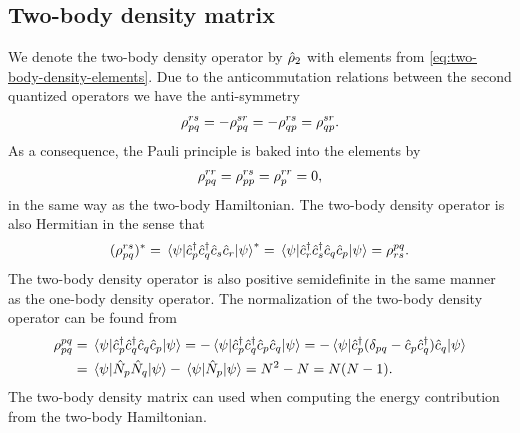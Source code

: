         \subsection{Two-body density matrix}
            We denote the two-body density operator by $\hat{\rho}_2$ with
            elements from \autoref{eq:two-body-density-elements}.
            Due to the anticommutation relations between the second quantized
            operators we have the anti-symmetry
            \begin{align}
                \rho^{rs}_{pq}
                = -\rho^{sr}_{pq}
                = -\rho^{rs}_{qp}
                = \rho^{sr}_{qp}.
            \end{align}
            As a consequence, the Pauli principle is baked into the elements by
            \begin{align}
                \rho^{rr}_{pq}
                = \rho^{rs}_{pp}
                = \rho^{rr}_{p}
                = 0,
            \end{align}
            in the same way as the two-body Hamiltonian.
            The two-body density operator is also Hermitian in the sense that
            \begin{align}
                (\rho^{rs}_{pq})^{*}
                = \mel*{\psi}{\hat{c}_{p}^{\dagger}\hat{c}_{q}^{\dagger}\hat{c}_{s}\hat{c}_{r}}{\psi}^{*}
                = \mel*{\psi}{\hat{c}_{r}^{\dagger}\hat{c}_{s}^{\dagger}\hat{c}_{q}\hat{c}_{p}}{\psi}
                = \rho^{pq}_{rs}.
            \end{align}
            The two-body density operator is also positive semidefinite in the
            same manner as the one-body density operator.
            The normalization of the two-body density operator can be found from
            \begin{align}
                \rho^{pq}_{pq}
                &= \mel*{\psi}{\hat{c}_{p}^{\dagger}\hat{c}_{q}^{\dagger}\hat{c}_{q}\hat{c}_{p}}{\psi}
                = -\mel*{\psi}{\hat{c}_{p}^{\dagger}\hat{c}_{q}^{\dagger}\hat{c}_{p}\hat{c}_{q}}{\psi}
                = -\mel*{\psi}{
                    \hat{c}_{p}^{\dagger}(\delta_{pq} - \hat{c}_{p}\hat{c}_{q}^{\dagger})\hat{c}_{q}
                }{\psi}
                \\
                &=
                \mel*{\psi}{\hat{N}_{p}\hat{N}_{q}}{\psi}
                - \mel*{\psi}{\hat{N}_{p}}{\psi}
                = N^2 - N
                = N(N - 1).
            \end{align}
            The two-body density matrix can used when computing the energy
            contribution from the two-body Hamiltonian.

